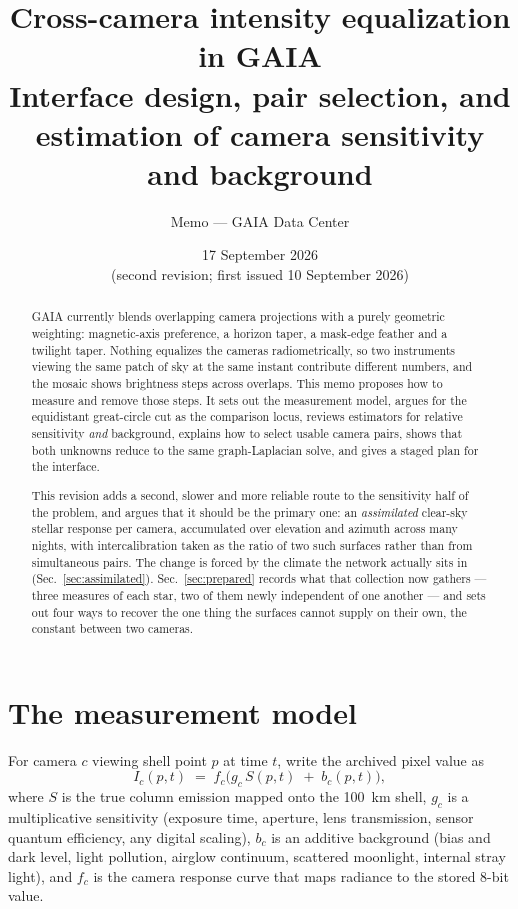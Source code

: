 \documentclass[11pt,a4paper]{article}
\title{\bfseries Cross-camera intensity equalization in GAIA\\[2mm]
\large Interface design, pair selection, and estimation of camera sensitivity and background}
\author{Memo --- GAIA Data Center}
\date{17 September 2026 \\ \small(second revision; first issued 10 September 2026)}
\newcommand{\gain}{g}
\newcommand{\off}{b}
\begin{document}
\maketitle

\begin{abstract}
\noindent
GAIA currently blends overlapping camera projections with a purely geometric
weighting: magnetic-axis preference, a horizon taper, a mask-edge feather and a
twilight taper. Nothing equalizes the cameras radiometrically, so two
instruments viewing the same patch of sky at the same instant contribute
different numbers, and the mosaic shows brightness steps across overlaps. This
memo proposes how to measure and remove those steps. It sets out the
measurement model, argues for the equidistant great-circle cut as the comparison
locus, reviews estimators for relative sensitivity \emph{and} background,
explains how to select usable camera pairs, shows that both unknowns reduce to
the same graph-Laplacian solve, and gives a staged plan for the interface.

This revision adds a second, slower and more reliable route to the sensitivity
half of the problem, and argues that it should be the primary one: an
\emph{assimilated} clear-sky stellar response per camera, accumulated over
elevation and azimuth across many nights, with intercalibration taken as the
ratio of two such surfaces rather than from simultaneous pairs. The change is
forced by the climate the network actually sits in
(Sec.~\ref{sec:assimilated}). Sec.~\ref{sec:prepared} records what that
collection now gathers --- three measures of each star, two of them newly
independent of one another --- and sets out four ways to recover the one thing
the surfaces cannot supply on their own, the constant between two cameras.
\end{abstract}

\section{The measurement model}

For camera $c$ viewing shell point $p$ at time $t$, write the archived pixel
value as
\begin{equation}
  I_c(p,t) \;=\; f_c\!\bigl(\gain_c\,S(p,t) \;+\; \off_c(p,t)\bigr),
  \label{eq:model}
\end{equation}
where $S$ is the true column emission mapped onto the \SI{100}{km} shell,
$\gain_c$ is a multiplicative sensitivity (exposure time, aperture, lens
transmission, sensor quantum efficiency, any digital scaling), $\off_c$ is an
additive background (bias and dark level, light pollution, airglow continuum,
scattered moonlight, internal stray light), and $f_c$ is the camera response
curve that maps radiance to the stored 8-bit value.
\end{document}
